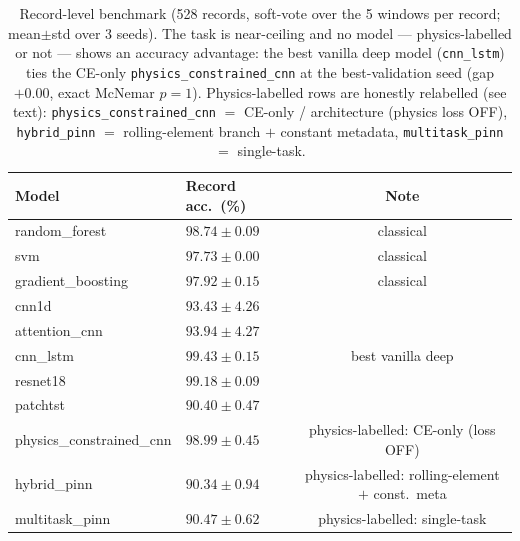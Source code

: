 \begin{table}[t]
  \centering
  \caption{Record-level benchmark (528 records, soft-vote over the 5 windows
    per record; mean$\pm$std over 3 seeds). The task is near-ceiling and no
    model --- physics-labelled or not --- shows an accuracy advantage: the best
    vanilla deep model (\texttt{cnn\_lstm}) ties the CE-only
    \texttt{physics\_constrained\_cnn} at the best-validation seed (gap $+0.00$,
    exact McNemar $p=1$). Physics-labelled rows are honestly relabelled (see
    text): \texttt{physics\_constrained\_cnn} $=$ CE-only / architecture
    (physics loss OFF), \texttt{hybrid\_pinn} $=$ rolling-element branch $+$
    constant metadata, \texttt{multitask\_pinn} $=$ single-task.}
  \label{tab:benchmark}
  \begin{tabular}{llc}
    \toprule
    Model & Record acc.\ (\%) & Note \\
    \midrule
    random\_forest          & $98.74 \pm 0.09$ & classical \\
    svm                     & $97.73 \pm 0.00$ & classical \\
    gradient\_boosting      & $97.92 \pm 0.15$ & classical \\
    \midrule
    cnn1d                   & $93.43 \pm 4.26$ & \\
    attention\_cnn          & $93.94 \pm 4.27$ & \\
    cnn\_lstm               & $\mathbf{99.43 \pm 0.15}$ & best vanilla deep \\
    resnet18                & $99.18 \pm 0.09$ & \\
    patchtst                & $90.40 \pm 0.47$ & \\
    \midrule
    physics\_constrained\_cnn & $98.99 \pm 0.45$ & physics-labelled: CE-only (loss OFF) \\
    hybrid\_pinn            & $90.34 \pm 0.94$ & physics-labelled: rolling-element $+$ const.\ meta \\
    multitask\_pinn         & $90.47 \pm 0.62$ & physics-labelled: single-task \\
    \bottomrule
  \end{tabular}
\end{table}
